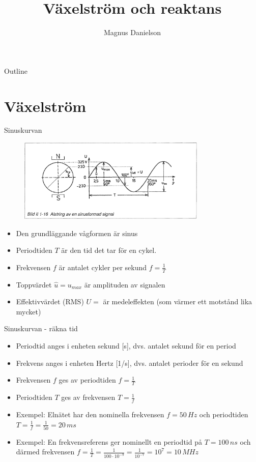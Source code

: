 \documentclass{beamer}
\title{Växelström och reaktans}
\author{Magnus Danielson}
\begin{document}
\begin{frame}
\titlepage
\end{frame}

\begin{frame}{Outline}
\tableofcontents
\end{frame}

\section{Växelström}

\begin{frame}{Sinuskurvan}

\begin{figure}[h]
\includegraphics[width=0.8\textwidth]{images/bild_2_1-16}
\label{fig:BildII1-16}
\end{figure}

\begin{itemize}
\item Den grundläggande vågformen är sinus
\item Periodtiden $T$ är den tid det tar för en cykel.
\item Frekvensen $f$ är antalet cykler per sekund $f=\frac{1}{T}$
\item Toppvärdet $\hat{u}=u_{max}$ är amplituden av signalen
  \item Effektivvärdet (RMS) $U = $ är medeleffekten (som värmer ett motstånd lika mycket)
\end{itemize}
\end{frame}

\begin{frame}{Sinuskurvan - räkna tid}
  \begin{itemize}
  \item Periodtid anges i enheten sekund [s], dvs. antalet sekund för en period
  \item Frekvens anges i enheten Hertz [1/s], dvs. antalet perioder för en sekund
  \item Frekvensen $f$ ges av periodtiden $f = \frac{1}{T}$
  \item Periodtiden $T$ ges av frekvensen $T = \frac{1}{f}$
  \item Exempel: Elnätet har den nominella frekvensen $f=50\,Hz$ och periodtiden $T=\frac{1}{f}=\frac{1}{50}=20\,ms$
  \item Exempel: En frekvensreferens ger nominellt en periodtid på $T=100\,ns$ och därmed frekvensen $f=\frac{1}{T}=\frac{1}{100\cdot10^{-9}}=\frac{1}{10^{-7}}=10^7=10\,MHz$
  \end{itemize}
\end{frame}
\end{document}
